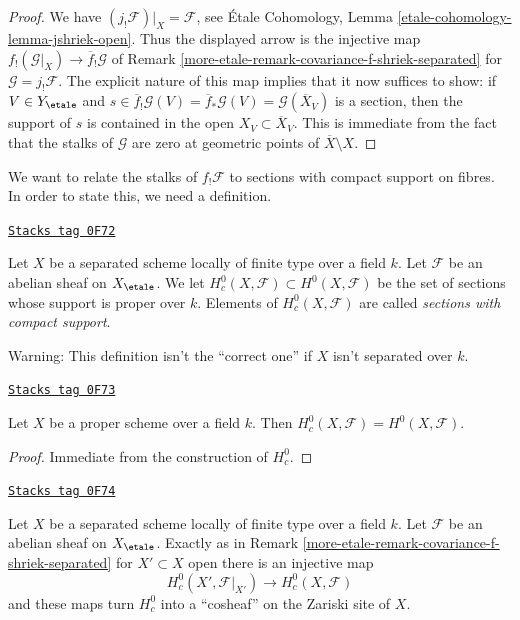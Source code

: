 \begin{proof}
We have $(j_!\mathcal{F})|_X = \mathcal{F}$, see
\'Etale Cohomology, Lemma \ref{etale-cohomology-lemma-jshriek-open}.
Thus the displayed arrow is the injective map
$f_!(\mathcal{G}|_X) \to \overline{f}_!\mathcal{G}$
of Remark \ref{more-etale-remark-covariance-f-shriek-separated}
for $\mathcal{G} = j_!\mathcal{F}$. The explicit nature
of this map implies that it now suffices to show: if $V \in Y_\etale$ and
$s \in \overline{f}_!\mathcal{G}(V) = \overline{f}_*\mathcal{G}(V) =
\mathcal{G}(\overline{X}_V)$
is a section, then the support of $s$ is contained in the open
$X_V \subset \overline{X}_V$. This is immediate from the fact
that the stalks of $\mathcal{G}$ are zero at geometric
points of $\overline{X} \setminus X$.
\end{proof}

We want to relate the stalks of $f_!\mathcal{F}$ to sections with
compact support on fibres. In order to state this, we need a definition.

\begin{definition}
\label{more-etale-definition-compact-support}
\href{https://stacks.math.columbia.edu/tag/0F72}{\texttt{Stacks tag 0F72}}

Let $X$ be a separated scheme locally of finite type over a field $k$.
Let $\mathcal{F}$ be an abelian sheaf on $X_\etale$. We let
$H^0_c(X, \mathcal{F}) \subset H^0(X, \mathcal{F})$ be the
set of sections whose support is proper over $k$. Elements of
$H^0_c(X, \mathcal{F})$ are called {\it sections with compact support}.
\end{definition}

Warning: This definition isn't the ``correct one'' if $X$ isn't
separated over $k$.

\begin{lemma}
\label{more-etale-lemma-proper-compact-support}
\href{https://stacks.math.columbia.edu/tag/0F73}{\texttt{Stacks tag 0F73}}

Let $X$ be a proper scheme over a field $k$. Then
$H^0_c(X, \mathcal{F}) = H^0(X, \mathcal{F})$.
\end{lemma}

\begin{proof}
Immediate from the construction of $H^0_c$.
\end{proof}

\begin{remark}

\label{more-etale-remark-covariance-compact-support}
\href{https://stacks.math.columbia.edu/tag/0F74}{\texttt{Stacks tag 0F74}}

Let $X$ be a separated scheme locally of finite type over a field $k$.
Let $\mathcal{F}$ be an abelian sheaf on $X_\etale$.
Exactly as in Remark \ref{more-etale-remark-covariance-f-shriek-separated}
for $X' \subset X$ open there is an injective map
$$
H^0_c(X', \mathcal{F}|_{X'}) \longrightarrow H^0_c(X, \mathcal{F})
$$
and these maps turn $H^0_c$ into a ``cosheaf'' on the Zariski site of $X$.
\end{remark}

